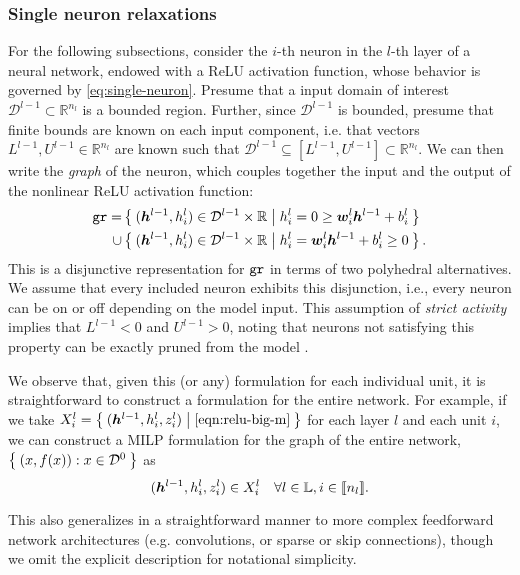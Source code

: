 \subsubsection{Single neuron relaxations}

For the following subsections, consider the $i$-th neuron in the $l$-th layer of a neural network, endowed with a ReLU activation function, whose behavior is governed by \eqref{eq:single-neuron}. Presume that a input domain of interest $\mathcal{D}^{l-1} \subset \mathbb{R}^{n_l}$ is a bounded region. Further, since $\mathcal{D}^{l-1}$ is bounded, presume that finite bounds are known on each input component, i.e. that vectors $L^{l-1},U^{l-1} \in \mathbb{R}^{n_l}$ are known such that $\mathcal{D}^{l-1} \subseteq [L^{l-1},U^{l-1}] \subset \mathbb{R}^{n_l}$. We can then write the \emph{graph} of the neuron, which couples together the input and the output of the nonlinear ReLU activation function:
\begin{align*}
    \texttt{gr} = &\Set{ ({\bm{h}}^{l-1},h^l_i) \in \mathcal{D}^{l-1} \times \mathbb{R} | h^l_i = 0 \geq {\bm{w}}^l_i {\bm{h}}^{l-1} + b^l_i} \\
    \cup &\Set{ ({\bm{h}}^{l-1},h^l_i) \in \mathcal{D}^{l-1} \times \mathbb{R} | h^l_i = {\bm{w}}^l_i {\bm{h}}^{l-1} + b^l_i \geq 0}.
\end{align*}
This is a disjunctive representation for $\texttt{gr}$ in terms of two polyhedral alternatives.
We assume that every included neuron exhibits this disjunction, i.e., every neuron can be on or off depending on the model input. 
This assumption of \emph{strict activity} implies that $L^{l-1} < 0$ and $U^{l-1} > 0$, noting that neurons not satisfying this property can be exactly pruned from the model \citep{serra2020lossless}. 

We observe that, given this (or any) formulation for each individual unit, it is straightforward to construct a formulation for the entire network. For example, if we take $X^l_i = \Set{({\bm{h}}^{l-1},h^l_i,z^l_i) | \eqref{eqn:relu-big-m} }$ for each layer $l$ and each unit $i$, we can construct a MILP formulation for the graph of the entire network, $\Set{(x,f(x)) : x \in \mathcal{D}^0}$ as
\[
    ({\bm{h}}^{l-1},h^l_i,z^l_i) \in X^l_i \quad \forall l \in {\mathbb{L}}, i \in \llbracket n_l \rrbracket.
 \]  

This also generalizes in a straightforward manner to more complex feedforward network architectures (e.g. convolutions, or sparse or skip connections), though we omit the explicit description for notational simplicity.

